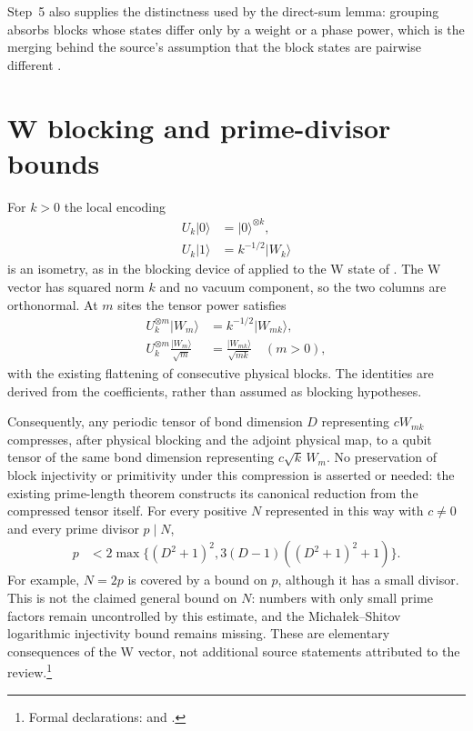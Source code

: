 \documentclass{article}
\begin{document}
Step~5 also supplies the distinctness used by the direct-sum lemma: grouping
absorbs blocks whose states differ only by a weight or a phase power, which is
the merging behind the source's assumption that the block states are pairwise
different \cite[lines~1329--1330]{PerezGarcia2007MPSReps}.

\section{W blocking and prime-divisor bounds}

For $k>0$ the local encoding
\begin{align}
    U_k|0\rangle & =|0\rangle^{\otimes k}, \\
    U_k|1\rangle & =k^{-1/2}|W_k\rangle
    \label{eq:rmp_w_state_ti_bound_block_encoding}
\end{align}
is an isometry, as in the blocking device of
\cite[lines~2090--2097]{PerezGarcia2007MPSReps} applied to the W state of
\cite[lines~2352--2361]{Cirac2021Matrix}. The W vector has squared norm $k$ and no vacuum component,
so the two columns are orthonormal. At $m$ sites the tensor power satisfies
\begin{align}
    U_k^{\otimes m}|W_m\rangle                  & =k^{-1/2}|W_{mk}\rangle,
    \label{eq:rmp_w_state_ti_bound_blocking} \\
    U_k^{\otimes m}\frac{|W_m\rangle}{\sqrt m} & =\frac{|W_{mk}\rangle}{\sqrt{mk}}
    \quad(m>0),
    \label{eq:rmp_w_state_ti_bound_blocking_normalized}
\end{align}
with the existing flattening of consecutive physical blocks. The identities
are derived from the coefficients, rather than assumed as blocking
hypotheses.

Consequently, any periodic tensor of bond dimension $D$ representing
$cW_{mk}$ compresses, after physical blocking and the adjoint physical map,
to a qubit tensor of the same bond dimension representing $c\sqrt k\,W_m$.
No preservation of block injectivity or primitivity under this compression
is asserted or needed: the existing prime-length theorem constructs its
canonical reduction from the compressed tensor itself. For every positive
$N$ represented in this way with $c\neq0$ and every prime divisor $p\mid N$,
\begin{align}
    p & <2\max\bigl\{(D^2+1)^2,3(D-1)((D^2+1)^2+1)\bigr\}.
    \label{eq:rmp_w_state_ti_bound_prime_divisor}
\end{align}
For example, $N=2p$ is covered by a bound on $p$, although it has a small
divisor. This is not the claimed general bound on $N$: numbers with only
small prime factors remain uncontrolled by this estimate, and the
Micha\l{}ek--Shitov logarithmic injectivity bound remains missing.
These are elementary consequences of the W vector, not additional source
statements attributed to the review.\footnote{Formal declarations:
 and
.}
\end{document}
